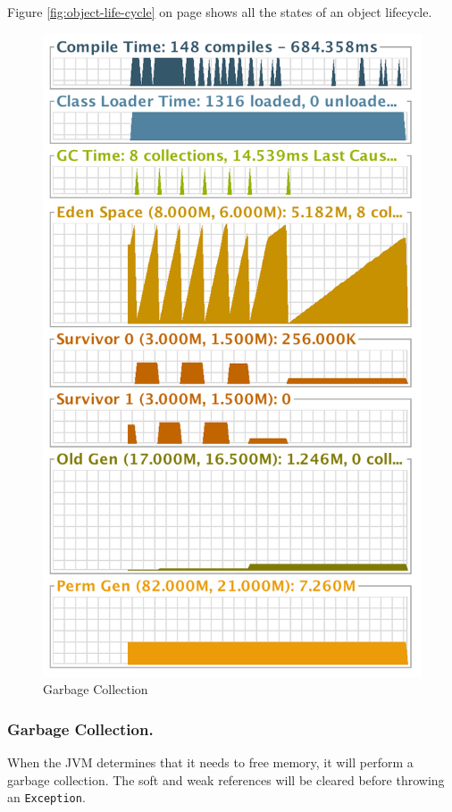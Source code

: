 Figure \ref{fig:object-life-cycle} on page \pageref{fig:object-life-cycle} shows all the states of an object lifecycle.
\begin{figure}[!h]\centering %
\includegraphics[width=\linewidth, frame]{garbage-collection}
\caption{Garbage Collection}
\label{fig:garbage-collection}
\end{figure}
\subsubsection{Garbage Collection.}
When the JVM determines that it needs to free memory, it will perform a garbage collection. The soft and weak references will be cleared before throwing an \texttt{Exception}.

